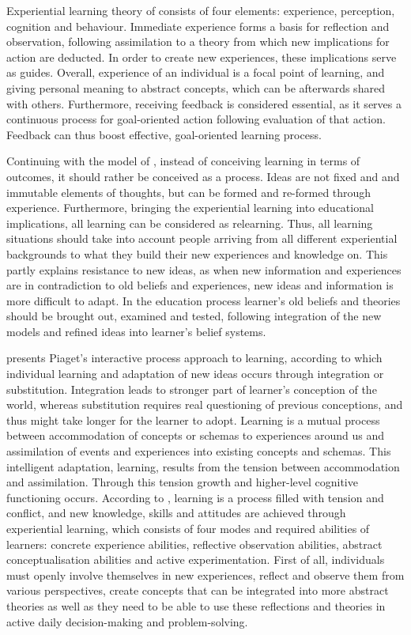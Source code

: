 Experiential learning theory of \citet{kolb1984experiential} consists of four elements: experience, perception, cognition and behaviour. Immediate experience forms a basis for reflection and observation, following assimilation to a theory from which new implications for action are deducted. In order to create new experiences, these implications serve as guides. Overall, experience of an individual is a focal point of learning, and giving personal meaning to abstract concepts, which can be afterwards shared with others. Furthermore, receiving feedback is considered essential, as it serves a continuous process for goal-oriented action following evaluation of that action. Feedback can thus boost effective, goal-oriented learning process. \citep{kolb1984experiential}

Continuing with the model of \citet{kolb1984experiential}, instead of conceiving learning in terms of outcomes, it should rather be conceived as a process. Ideas are not fixed and and immutable elements of thoughts, but can be formed and re-formed through experience. Furthermore, bringing the experiential learning into educational implications, all learning can be considered as relearning. Thus, all learning situations should take into account people arriving from all different experiential backgrounds to what they build their new experiences and knowledge on. This partly explains resistance to new ideas, as when new information and experiences are in contradiction to old beliefs and experiences, new ideas and information is more difficult to adapt. In the education process learner's old beliefs and theories should be brought out, examined and tested, following integration of the new models and refined ideas into learner's belief systems. \citep{kolb1984experiential}

\citet{kolb1984experiential} presents Piaget's interactive process approach to learning, according to which individual learning and adaptation of new ideas occurs through integration or substitution. Integration leads to stronger part of learner's conception of the world, whereas substitution requires real questioning of previous conceptions, and thus might take longer for the learner to adopt. Learning is a mutual process between accommodation of concepts or schemas to experiences around us and assimilation of events and experiences into existing concepts and schemas. This intelligent adaptation, learning, results from the tension between accommodation and assimilation. Through this tension growth and higher-level cognitive functioning occurs. According to \citet{kolb1984experiential}, learning is a process filled with tension and conflict, and new knowledge, skills and attitudes are achieved through experiential learning, which consists of four modes and required abilities of learners: concrete experience abilities, reflective observation abilities, abstract conceptualisation abilities and active experimentation. First of all, individuals must openly involve themselves in new experiences, reflect and observe them from various perspectives, create concepts that can be integrated into more abstract theories as well as they need to be able to use these reflections and theories in active daily decision-making and problem-solving.  

